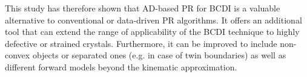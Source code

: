 This study has therefore shown that AD-based PR for BCDI is a valuable alternative to conventional or data-driven PR algorithms. 
It offers an additional tool that can extend the range of applicability of the BCDI technique to highly defective or strained 
crystals. Furthermore, it can be improved to include non-convex objects or separated ones (e.g. in case of twin boundaries) 
as well as different forward models beyond the kinematic approximation. 
